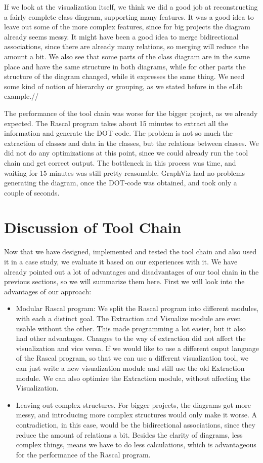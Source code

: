 \documentclass[a4paper,11pt]{article}
\begin{document}
			If we look at the visualization itself, we think we did a good job at reconstructing a fairly complete class diagram, supporting many features. It was a good idea to leave out some of the more complex features, since for big projects the diagram already seems messy. It might have been a good idea to merge bidirectional associations, since there are already many relations, so merging will reduce the amount a bit. We also see that some parts of the class diagram are in the same place and have the same structure in both diagrams, while for other parts the structure of the diagram changed, while it expresses the same thing. We need some kind of notion of hierarchy or grouping, as we stated before in the eLib example.//

			The performance of the tool chain was worse for the bigger project, as we already expected. The Rascal program takes about 15 minutes to extract all the information and generate the DOT-code. The problem is not so much the extraction of classes and data in the classes, but the relations between classes. We did not do any optimizations at this point, since we could already run the tool chain and get correct output. The bottleneck in this process was time, and waiting for 15 minutes was still pretty reasonable. GraphViz had no problems generating the diagram, once the DOT-code was obtained, and took only a couple of seconds.
			
	\section{Discussion of Tool Chain}
		Now that we have designed, implemented and tested the tool chain and also used it in a case study, we evaluate it based on our experiences with it. We have already pointed out a lot of advantages and disadvantages of our tool chain in the previous sections, so we will summarize them here. First we will look into the advantages of our approach:
		
		\begin{itemize}
			\item Modular Rascal program: We split the Rascal program into different modules, with each a distinct goal. The Extraction and Visualize module are even usable without the other. This made programming a lot easier, but it also had other advantages. Changes to the way of extraction did not affect the visualization and vice versa. If we would like to use a different ouput language of the Rascal program, so that we can use a different visualization tool, we can just write a new visualization module and still use the old Extraction module. We can also optimize the Extraction module, without affecting the Visualization.
			\item Leaving out complex structures. For bigger projects, the diagrams got more messy, and introducing more complex structures would only make it worse. A contradiction, in this case, would be the bidirectional associations, since they reduce the amount of relations a bit. Besides the clarity of diagrams, less complex things, means we have to do less calculations, which is advantageous for the performance of the Rascal program.
		\end{itemize}
		
\end{document}

